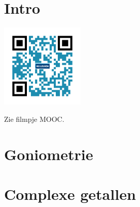 
\section*{Intro}

\begin{minipage}{.25\linewidth}
	\raggedright
	\includegraphics[width=4cm]{3_gonio_complexe_getallen/inputs/QR_Code_INTRO_module3}
\end{minipage}
\begin{minipage}{.7\linewidth}
	Zie filmpje MOOC.
\end{minipage}

\section{Goniometrie}

%

\section{Complexe getallen}

